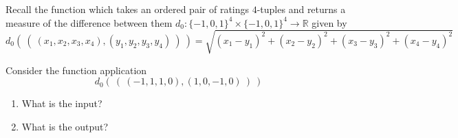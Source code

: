 
Recall the function which takes an ordered pair of ratings $4$-tuples and returns a measure of the difference between them
$d_0: \{-1,0,1\}^4 \times \{-1,0,1\}^4 \to \mathbb{R}$
given by
\[
d_0 (~(~ (x_1, x_2, x_3, x_4), (y_1, y_2, y_3, y_4) ~) ~) = \sqrt{ (x_1 - y_1)^2 + (x_2 - y_2)^2 + (x_3 -y_3)^2 + (x_4 -y_4)^2}
\]

Consider the function application 
\[
  d_0 (~( ~(-1,1,1, 0), (1, 0, -1, 0)~) ~)
\]
\begin{enumerate}
    \item What is the input? 
    \item What is the output?
\end{enumerate}